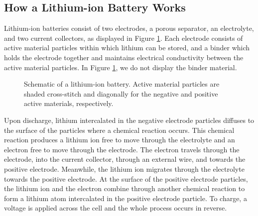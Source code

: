 \documentclass[preprint]{elsarticle}
\begin{document}
\subsection{How a Lithium-ion Battery Works}
Lithium-ion batteries consist of two electrodes, a porous separator, an electrolyte, and two current collectors, as displayed in Figure \ref{fig:liBat}. Each electrode consists of active material particles within which lithium can be stored, and a binder which holds the electrode together and maintains electrical conductivity between the active material particles. In Figure \ref{fig:liBat}, we do not display the binder material. 
\begin{figure}[h!]
	\centering
	\LiBattery
    \caption{Schematic of a lithium-ion battery. Active material particles are shaded cross-stitch and diagonally for the negative and positive active materials, respectively.}\label{fig:liBat}
\end{figure} 
Upon discharge, lithium intercalated in the negative electrode particles diffuses to the surface of the particles where a chemical reaction occurs. This chemical reaction produces a lithium ion free to move through the electrolyte and an electron free to move through the electrode. The electron travels through the electrode, into the current collector, through an external wire, and towards the positive electrode. Meanwhile, the lithium ion migrates through the electrolyte towards the positive electrode. At the surface of the positive electrode particles, the lithium ion and the electron combine through another chemical reaction to form a lithium atom intercalated in the positive electrode particle. To charge, a voltage is applied across the cell and the whole process occurs in reverse.
\end{document}
